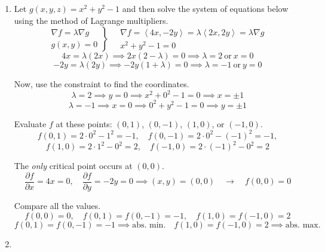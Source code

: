 \documentclass[a4paper, 12pt]{article}
\begin{document}
\begin{enumerate}[leftmargin=*,label=\textbf{\arabic*.}]
\item Let $g(x,y,z)=x^2+y^2-1$ and then solve the system of equations below using the method of Lagrange multipliers.
\[
\left.
\begin{array}{ll}
\displaystyle\nabla f =\lambda \nabla g \\
\displaystyle g(x,y) = 0
\end{array}
\right\}\quad
\begin{array}{ll}
\nabla f=\left\langle4x,-2y\right\rangle = \lambda\left\langle2x,2y\right\rangle = \lambda\nabla g \\[0.1cm] x^2+y^2-1=0
\end{array}
\]
\[4x=\lambda(2x)\implies2x(2-\lambda)=0\implies\lambda=2\:\text{or}\:x=0\]
\[-2y=\lambda(2y)\implies-2y(1+\lambda)=0\implies\lambda=-1\:\text{or}\:y=0\]

Now, use the constraint to find the coordinates.
\[\lambda=2\implies y=0\implies x^2+0^2-1=0\implies x=\pm1\]
\[\lambda=-1\implies x=0\implies 0^2+y^2-1=0\implies y=\pm1\]

Evaluate $f$ at these points: $(0,1)$, $(0,-1)$, $(1,0)$, or $(-1,0)$.
\[f(0,1)=2\cdot0^2-1^2=-1,\quad f(0,-1) =2\cdot0^2-(-1)^2=-1,\]
\[f(1,0)=2\cdot1^2-0^2=2,\quad f(-1,0)=2\cdot(-1)^2-0^2=2\]

The \textit{only} critical point occurs at $(0,0)$.
\[\frac{\partial f}{\partial x}=4x=0,\quad\frac{\partial f}{\partial y}=-2y=0\implies(x,y)=(0,0)\quad\rightarrow\quad f(0,0)=0\]

Compare all the values.
\[f(0,0)=0,\quad f(0,1)=f(0,-1)=-1,\quad f(1,0)=f(-1,0)=2\]
\[\boxed{f(0,1)=f(0,-1)=-1\implies\text{abs. min.}\quad f(1,0)=f(-1,0)=2\implies\text{abs. max.}}\]

\item\leavevmode
\vspace{-1em}
\begin{center}
\end{center}
\end{enumerate}
\end{document}
